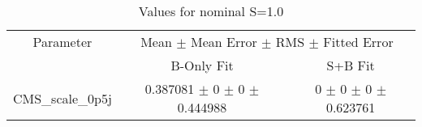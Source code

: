 \begin{table}
\centering
\caption{Values for nominal S=1.0}
\begin{tabular}{ccc}
\toprule
Parameter & \multicolumn{2}{c}{Mean $\pm$ Mean Error $\pm$ RMS $\pm$ Fitted Error}\\
 & B-Only Fit & S+B Fit\\
\midrule
CMS\_scale\_0p5j & \num{0.387081} $\pm$ \num{0} $\pm$ \num{0} $\pm$ \num{0.444988} & \num{0} $\pm$ \num{0} $\pm$ \num{0} $\pm$ \num{0.623761}\\
\bottomrule
\end{tabular}
\end{table}